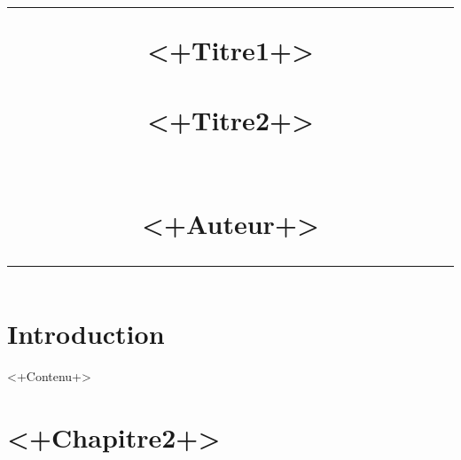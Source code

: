\documentclass{scrreprt}
\title{%
\flushright
\rule{16cm}{5pt}\vskip1cm
\Huge{<+Titre1+>}\\
\vspace{2cm}
~\\
\vspace{2cm}
<+Titre2+>\\
\vspace{2cm}
\LARGE{~\\}
\vspace{2cm}
\LARGE{~\\}
\vspace{2cm}
<+Auteur+>\\
\vfill
\rule{16cm}{5pt}
}
\date{}
\author{}
\begin{document}
\maketitle
\tableofcontents
\chapter{Introduction}

<+Contenu+>

\begingroup
\renewcommand{\cleardoublepage}{}
\renewcommand{\clearpage}{}
\chapter{<+Chapitre2+>}
\endgroup
\end{document}
